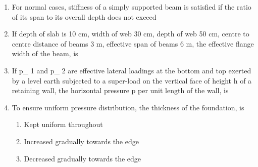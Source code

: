 \documentclass[11pt,a4paper]{article}
\begin{document}
\begin{enumerate}
\begin{enumerate}[label=\Alph*.]
\end{enumerate}
\item{For normal cases, stiffness of a simply supported beam is satisfied if the ratio of its span to its overall depth does not exceed}
\\
\item{If depth of slab is 10 cm, width of web 30 cm, depth of web 50 cm, centre to centre distance of beams 3 m, effective span of beams 6 m, the effective flange width of the beam, is}
\\\begin{enumerate*}[itemjoin=\qquad, label=\Alph*.]
\item{200 cm}
\item{300 cm}
\item{150 cm}
\item{100 cm}
\end{enumerate*}
\item{If p\_ 1 and p\_ 2 are effective lateral loadings at the bottom and top exerted by a level earth subjected to a super-load on the vertical face of height h of a retaining wall, the horizontal pressure p per unit length of the wall, is
}
\\
\item{To ensure uniform pressure distribution, the thickness of the foundation, is}
\begin{enumerate}[label=\Alph*.]
\item{Kept uniform throughout}
\item{Increased gradually towards the edge}
\item{Decreased gradually towards the edge}

\end{enumerate}
\end{enumerate}
\end{document}
